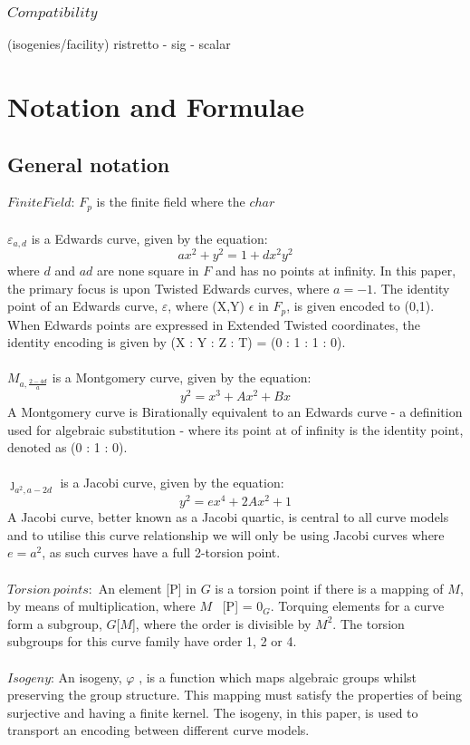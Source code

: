 \documentclass{article}
\begin{document}
\subsubsection{$Compatibility$} (isogenies/facility) ristretto - sig - scalar

\section{Notation and Formulae} 
\subsection{General notation}
$Finite Field$: $F_p$ is the finite field where the $char$ \\\\
$\varepsilon_{a,d}$ is a Edwards curve, given by the equation: $$ {a}x^2+y^2=1+{d}x^2y^2 $$ where {$d$} and {$ad$} are none square in $F$ and has no points at infinity. In this paper, the primary focus is upon Twisted Edwards curves, where $a = -1$. The identity point of an Edwards curve, $\varepsilon$, where (X,Y) $\epsilon$ in $F_p$, is given encoded to (0,1). When Edwards points are expressed in Extended Twisted coordinates, the identity encoding is given by (X : Y : Z : T) = (0 : 1 : 1 : 0).\\\\
${M}_{a,\frac{2-4d}{a}}$ is a Montgomery curve, given by the equation: $$ y^2=x^3+Ax^2+Bx $$ A Montgomery curve is Birationally equivalent to an Edwards curve - a definition used for algebraic substitution -  where its point at of infinity is the identity point, denoted as (0 : 1 : 0).\\\\  
$\jmath_{a^{2},a−2d}$ is a Jacobi curve, given by the equation: $$y
^2 = {e}x^4 + 2Ax^2 + 1$$ A Jacobi curve, better known as a Jacobi quartic, is central to all curve models and to utilise this curve relationship we will only be using Jacobi curves where $e = {a}^2$, as such curves have a full 2-torsion point.\\\\
$Torsion\ points$:\ An element [P] in  $G$ is a torsion point if there is a mapping of $M$, by means of multiplication, where $M$ \cdot\ [P] = $0_{G}$. Torquing elements for a curve form a subgroup, $G$[$M$], where the order is divisible by ${M}^2$. The torsion subgroups for this curve family have order 1, 2 or 4.  \\\\ 
$Isogeny$: An isogeny, $\varphi$ , is a function which maps algebraic groups whilst preserving the group structure. This mapping must satisfy the properties of being surjective and having a finite kernel. The isogeny, in this paper, is used to transport an encoding between different curve models.\\\\
\end{document}
